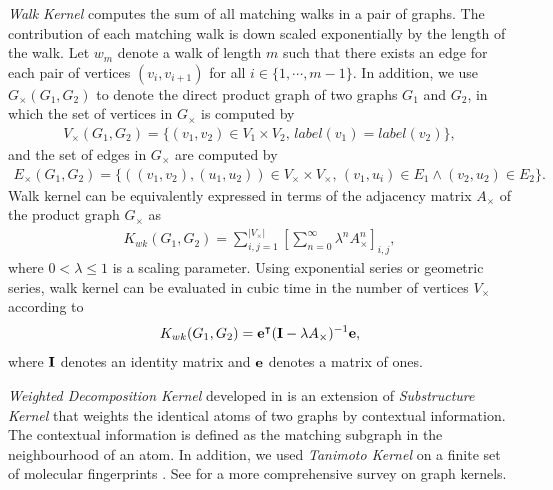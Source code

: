 {%
\textit{Walk Kernel} \citep{Kashima03marginalized,Gartner03a} computes the sum of all matching walks in a pair of graphs. 
The contribution of each matching walk is down scaled exponentially by the length of the walk.
Let $w_m$ denote a walk of length $m$ such that there exists an edge for each pair of vertices $(v_i,v_{i+1})$ for all $i\in\{1,\cdots,m-1\}$.
In addition, we use $G_{\times}(G_1,G_2)$ to denote the direct product graph of two graphs $G_1$ and $G_2$, in which the set of vertices in $G_{\times}$ is computed by 
\begin{align*}
	V_{\times}(G_1,G_2) = \{(v_1,v_2)\in V_1\times V_2,\, label(v_1)=label(v_2)\},
\end{align*}
and the set of edges in $G_{\times}$ are computed by
\begin{align*}
	E_{\times}(G_1,G_2) = \{((v_1,v_2),(u_1,u_2))\in V_{\times}\times V_{\times},\, (v_1,u_i)\in E_1\wedge (v_2,u_2)\in E_2\}.
\end{align*}
Walk kernel can be equivalently expressed in terms of the adjacency matrix $A_{\times}$ of the product graph $G_{\times}$ as
\begin{align*}
	K_{wk}(G_1,G_2) = \sum_{i,j=1}^{|V_{\times}|}\left[\sum_{n=0}^{\infty}\lambda^{n}A_{\times}^n\right]_{i,j},
\end{align*}
where $0<\lambda\le1$ is a scaling parameter.
Using exponential series or geometric series, walk kernel can be evaluated in cubic time \citep{Gartner03a} in the number of vertices $V_{\times}$ according to
\begin{align*}
	K_{wk}(G_1,G_2) = \mathbf {e}^{\intercal}(\mathbf{I}-\lambda A_{\times})^{-1}\mathbf {e},
\end{align*}
where $\mathbf{I}$ denotes an identity matrix and $\mathbf {e}$ denotes a matrix of ones.

\textit{Weighted Decomposition Kernel} developed in \citep{Menchetti05weighted,Ceroni08classification} is an extension of \textit{Substructure Kernel} \citep{Haussler99convolution} that weights the identical atoms of two graphs by contextual information.
The contextual information is defined as the matching subgraph in the neighbourhood of an atom.
In addition, we used \textit{Tanimoto Kernel} \citep{Ralaivola05graph} on a finite set of molecular fingerprints \citep{Wang09pubchem}.
See \citep{Vishwanathan10graph} for a more comprehensive survey on graph kernels.

}
